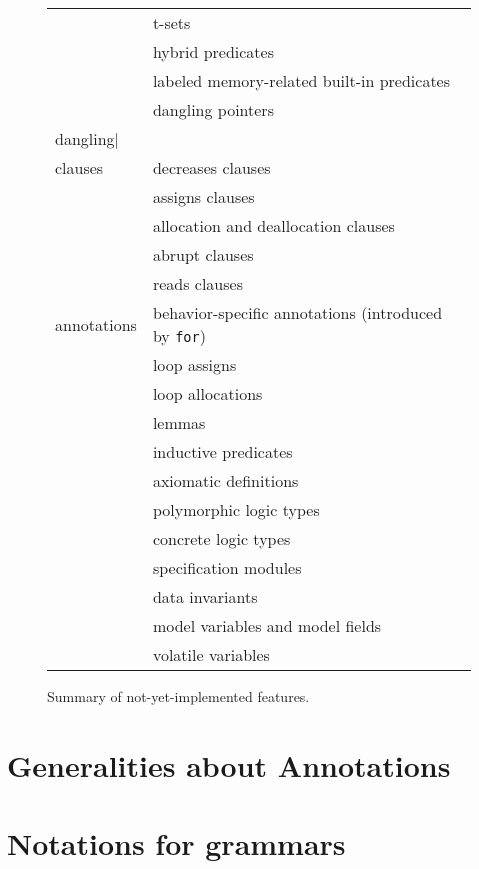 {\begin{figure}[htbp]
\begin{center}
\begin{tabular}{|l|l|}
      & t-sets \\
      & hybrid predicates \\
      & labeled memory-related built-in predicates \\
      & dangling pointers \lstinline|\\dangling|
      \\
      \hline
      clauses
      & decreases clauses \\
      & assigns clauses \\
      & allocation and deallocation clauses \\
      & abrupt clauses \\
      & reads clauses
      \\
      \hline
      annotations
      & behavior-specific annotations (introduced by \lstinline|for|) \\
      & loop assigns \\
      & loop allocations \\
      & lemmas \\
      & inductive predicates \\
      & axiomatic definitions \\
      & polymorphic logic types \\
      & concrete logic types \\
      & specification modules \\
      & data invariants \\
      & model variables and model fields \\
      & volatile variables
      \\
      \hline
    \end{tabular}
  \end{center}
  \caption{Summary of not-yet-implemented features.}
\end{figure}
}%
{}

\section{Generalities about Annotations}\label{sec:gener-about-annot}
\nodiff

\section{Notations for grammars}
\nodiff
